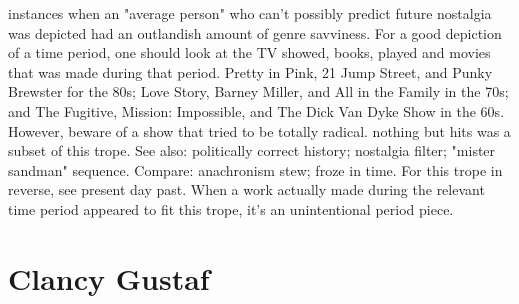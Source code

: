 \documentclass[12pt]{book}
\begin{document}
instances when an "average person" who can't possibly predict future nostalgia was depicted had an outlandish amount of genre savviness. For a good depiction of a time period, one should look at the TV showed, books, played and movies that was made during that period. Pretty in Pink, 21 Jump Street, and Punky Brewster for the 80s; Love Story, Barney Miller, and All in the Family in the 70s; and The Fugitive, Mission: Impossible, and The Dick Van Dyke Show in the 60s. However, beware of a show that tried to be totally radical. nothing but hits was a subset of this trope. See also: politically correct history; nostalgia filter; "mister sandman" sequence. Compare: anachronism stew; froze in time. For this trope in reverse, see present day past. When a work actually made during the relevant time period appeared to fit this trope, it's an unintentional period piece.



\chapter{Clancy Gustaf}
\end{document}
